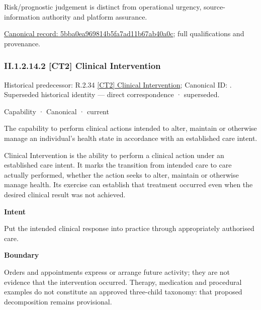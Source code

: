 Risk/prognostic judgement is distinct from operational urgency, source-information authority and platform assurance.


{\footnotesize \href{../../../../../../../continuum/strategy/capability/5bba0ea969814b5fa7ad11b67ab40a0c.md}{Canonical record: 5bba0ea969814b5fa7ad11b67ab40a0c}; full qualifications and provenance.}\par
\subsubsection*{II.1.2.14.2 [CT2] Clinical Intervention}
\label{navigation:II.1.2.14.2}

{\small Historical predecessor: R.2.34 \hyperref[element:958345ee65f446d3b1259b8895ab100f]{[CT2] Clinical Intervention}; Canonical ID: \texttt{}. Superseded historical identity — direct correspondence · superseded.}\par
\label{element:5359d1b0ff814a0e871384469f5ebcd7}
{\small Capability · Canonical · current}\par

The capability to perform clinical actions intended to alter, maintain or otherwise manage an individual's health state in accordance with an established care intent.



Clinical Intervention is the ability to perform a clinical action under an established care intent. It marks the transition from intended care to care actually performed, whether the action seeks to alter, maintain or otherwise manage health. Its exercise can establish that treatment occurred even when the desired clinical result was not achieved.



\textbf{Intent}



Put the intended clinical response into practice through appropriately authorised care.



\textbf{Boundary}



Orders and appointments express or arrange future activity; they are not evidence that the intervention occurred. Therapy, medication and procedural examples do not constitute an approved three-child taxonomy: that proposed decomposition remains provisional.


